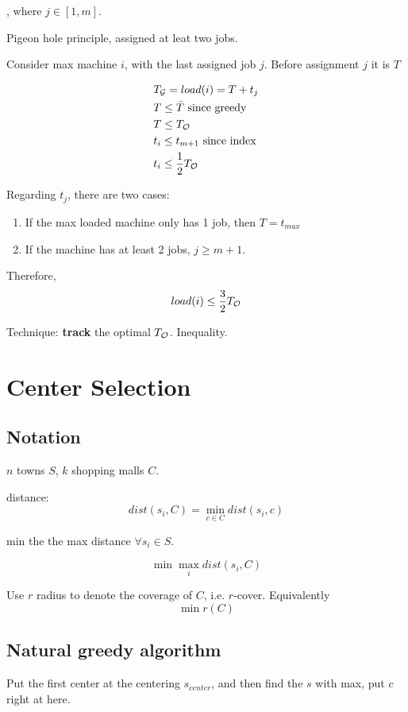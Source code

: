 \documentclass[a4paper]{report}
\theoremstyle{definition}
\begin{document}
, where $j\in[1, m]$.

Pigeon hole principle, assigned at leat two jobs.

Consider max machine $i$, with the last assigned job $j$. Before assignment $j$ it is $T$

\begin{align*}
& T_{\mathcal{G}}=load(i) = T+t_j\\
& T \leq \bar T \text{ since greedy}\\
& T \leq T_{\mathcal{O}} \\
& t_i \leq t_{m+1} \text{ since index} \\
& t_i \leq \frac{1}{2}T_{\mathcal{O}}
\end{align*}

Regarding $t_j$, there are two cases:
\begin{enumerate}
\item If the max loaded machine only has 1 job, then $T = t_{max}$
\item If the machine has at least 2 jobs, $j\geq m+1$.
\end{enumerate}

Therefore,
$$load(i)\leq \frac{3}{2} T_{\mathcal{O}}$$

Technique: \textbf{track} the optimal $T_{\mathcal{O}}$. Inequality.

\section{Center Selection}
\subsection{Notation}
$n$ towns $S$, $k$ shopping malls $C$.

distance:
$$
dist(s_i, C) =\min_{c\in C} dist(s_i, c)
$$

min the the max distance $\forall s_i \in S$.

$$
\min \max_i dist(s_i, C)
$$

Use $r$ radius to denote the coverage of $C$, i.e. $r$-cover. Equivalently
$$
\min r(C)
$$
\subsection{Natural greedy algorithm}
Put the first center at the centering $s_{center}$, and then find the $s$ with max, put $c$ right at here.
\end{document}
